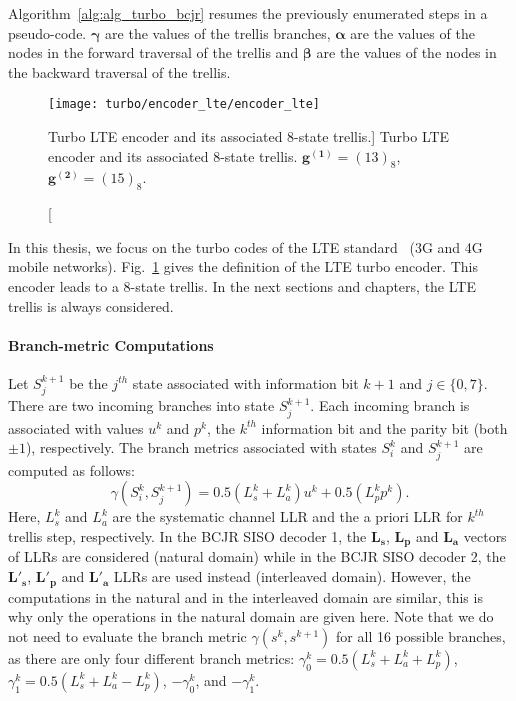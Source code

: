 Algorithm~\ref{alg:alg_turbo_bcjr} resumes the previously enumerated steps in
a pseudo-code. $\bm{\gamma}$ are the values of the trellis branches,
$\bm{\alpha}$ are the values of the nodes in the forward traversal of the
trellis and $\bm{\beta}$ are the values of the nodes in the backward traversal
of the trellis.

\begin{figure}[htp]
  \centering
  \texttt{[image: turbo/encoder\_lte/encoder\_lte]}
  \caption
    [Turbo LTE encoder and its associated 8-state trellis.]
    {Turbo LTE encoder and its associated 8-state trellis.
     $\bm{g^{(1)}} = (13)_8$, $\bm{g^{(2)}} = (15)_8$.}
  \label{fig:alg_turbo_encoder_lte}
\end{figure}

In this thesis, we focus on the turbo codes of the LTE standard~\cite{ETSI2013}
(3G and 4G mobile networks). Fig.~\ref{fig:alg_turbo_encoder_lte} gives the
definition of the LTE turbo encoder. This encoder leads to a 8-state trellis. In
the next sections and chapters, the LTE trellis is always considered.

\paragraph{Branch-metric Computations}

Let $S_j^{k+1}$ be the $j^{th}$ state associated with information bit $k+1$ and
$j \in \{0,7\}$. There are two incoming branches into state $S_j^{k+1}$. Each
incoming branch is associated with values $u^k$ and $p^k$, the $k^{th}$
information bit and the parity bit (both $\pm1$), respectively. The branch
metrics associated with states $S_i^k$ and $S_j^{k+1}$ are computed as follows:
\begin{equation}
\label{eq:turbo_gamma}
 \gamma(S_i^k, S_j^{k+1}) = 0.5(L_{s}^k + L_a^k)u^k + 0.5(L_p^k p^k).
\end{equation}
Here, $L_{s}^k$ and $L_a^k$ are the systematic channel LLR and the a priori
LLR for $k^{th}$ trellis step, respectively.
In the BCJR SISO decoder 1, the $\bm{L_{s}}$, $\bm{L_{p}}$ and $\bm{L_{a}}$
vectors of LLRs are considered (natural domain) while in the BCJR SISO decoder
2, the $\bm{L'_{s}}$, $\bm{L'_{p}}$ and $\bm{L'_{a}}$ LLRs are used instead
(interleaved domain). However, the computations in the natural and in the
interleaved domain are similar, this is why only the operations in the natural
domain are given here. Note that we do not need to evaluate the branch metric
$\gamma(s^k , s^{k+1})$ for all 16 possible branches, as there are only four
different branch metrics:
$\gamma^k_0 = 0.5(L_{s}^k + L_a^k + L_p^k)$,
$\gamma^k_1 = 0.5(L_{s}^k + L_a^k - L_p^k)$, $-\gamma^k_0$, and $-\gamma^k_1$.

